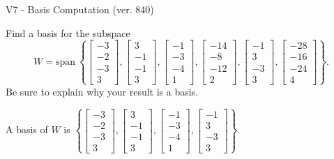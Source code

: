 \begin{exercise}
  \begin{exerciseTitle}V7 - Basis Computation (ver. 840)\end{exerciseTitle}
  \begin{exerciseStatement}
    Find a basis for the subspace 
\[W=\mathrm{span}\ \left\{\left[\begin{array}{r}
-3 \\
-2 \\
-3 \\
3
\end{array}\right] , \left[\begin{array}{r}
3 \\
-1 \\
-1 \\
3
\end{array}\right] , \left[\begin{array}{r}
-1 \\
-3 \\
-4 \\
1
\end{array}\right] , \left[\begin{array}{r}
-14 \\
-8 \\
-12 \\
2
\end{array}\right] , \left[\begin{array}{r}
-1 \\
3 \\
-3 \\
3
\end{array}\right] , \left[\begin{array}{r}
-28 \\
-16 \\
-24 \\
4
\end{array}\right]\right\}.\]
 Be sure to explain why your result is a basis.


  \end{exerciseStatement}
  \begin{exerciseAnswer}
   A basis of \(W\) is  \(\left\{\left[\begin{array}{r}
-3 \\
-2 \\
-3 \\
3
\end{array}\right] , \left[\begin{array}{r}
3 \\
-1 \\
-1 \\
3
\end{array}\right] , \left[\begin{array}{r}
-1 \\
-3 \\
-4 \\
1
\end{array}\right] , \left[\begin{array}{r}
-1 \\
3 \\
-3 \\
3
\end{array}\right]\right\}\).
  


  \end{exerciseAnswer}
\end{exercise}